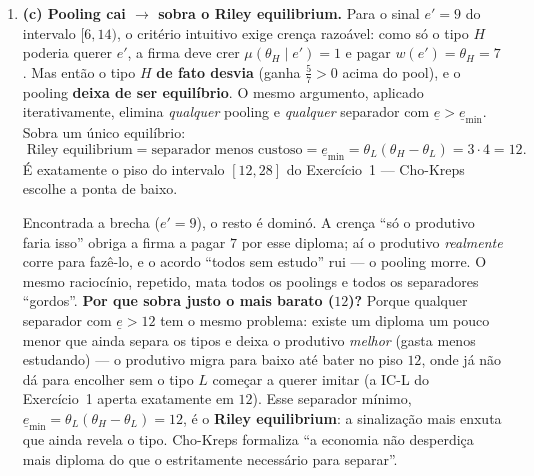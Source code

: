 \documentclass[11pt,a4paper]{article}
\begin{document}
\begin{enumerate}[leftmargin=2em,itemsep=4pt]
\item \textbf{(c) Pooling cai $\to$ sobra o Riley equilibrium.} Para o sinal $e'=9$ do
intervalo $[6,14)$, o critério intuitivo exige crença razoável: como só o tipo $H$ poderia
querer $e'$, a firma deve crer $\mu(\theta_H\mid e')=1$ e pagar $w(e')=\theta_H=7$. Mas então
o tipo $H$ \textbf{de fato desvia} (ganha $\tfrac57>0$ acima do pool), e o pooling
\textbf{deixa de ser equilíbrio}. O mesmo argumento, aplicado iterativamente, elimina
\emph{qualquer} pooling e \emph{qualquer} separador com $\underline e>\underline e_{\min}$.
Sobra um único equilíbrio:
\[
\boxed{\;\text{Riley equilibrium} = \text{separador menos custoso} = \underline e_{\min}
= \theta_L(\theta_H-\theta_L) = 3\cdot 4 = 12.\;} \tag{2.5}
\]
É exatamente o piso do intervalo $[12,28]$ do Exercício~1 — Cho-Kreps escolhe a ponta de baixo.

\begin{empalavras}
Encontrada a brecha ($e'=9$), o resto é dominó. A crença ``só o produtivo faria isso'' obriga a
firma a pagar $7$ por esse diploma; aí o produtivo \emph{realmente} corre para fazê-lo, e o
acordo ``todos sem estudo'' rui — o pooling morre. O mesmo raciocínio, repetido, mata todos os
poolings e todos os separadores ``gordos''. \textbf{Por que sobra justo o mais barato ($12$)?}
Porque qualquer separador com $\underline e>12$ tem o mesmo problema: existe um diploma um pouco
menor que ainda separa os tipos e deixa o produtivo \emph{melhor} (gasta menos estudando) — o
produtivo migra para baixo até bater no piso $12$, onde já não dá para encolher sem o tipo $L$
começar a querer imitar (a IC-L do Exercício~1 aperta exatamente em $12$). Esse separador
mínimo, $\underline e_{\min}=\theta_L(\theta_H-\theta_L)=12$, é o \textbf{Riley equilibrium}: a
sinalização mais enxuta que ainda revela o tipo. Cho-Kreps formaliza ``a economia não desperdiça
mais diploma do que o estritamente necessário para separar''.
\end{empalavras}

\end{enumerate}
\end{document}
